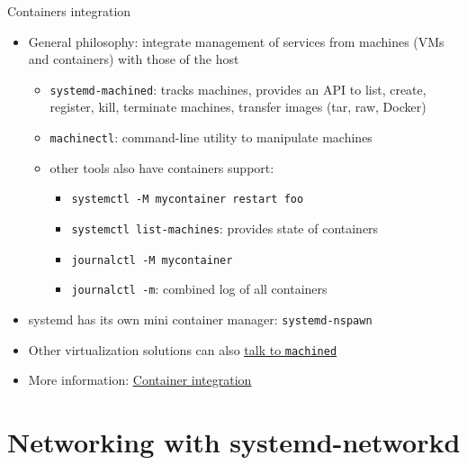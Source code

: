 \documentclass[11pt,final,usepdftitle=false]{beamer}
\begin{document}
\begin{frame}{Containers integration}
\begin{itemize}
	\item General philosophy: \alert{integrate management of services from machines (VMs and containers) with those of the host}
	\begin{itemize}
		\item \texttt{systemd-machined}: tracks machines, provides an API to list, create, register, kill, terminate machines, transfer images (tar, raw, Docker)
			\hbr
		\item \texttt{machinectl}: command-line utility to manipulate machines
			\hbr
		\item other tools also have containers support:
			\begin{itemize}
				\item \texttt{systemctl -M mycontainer restart foo}
				\item \texttt{systemctl list-machines}: provides state of containers
				\item \texttt{journalctl -M mycontainer}
				\item \texttt{journalctl -m}: combined log of all containers
			\end{itemize}
	\end{itemize}
\hbr
\item systemd has its own mini container manager: \texttt{systemd-nspawn}
\hbr
\item Other virtualization solutions can also \href{http://www.freedesktop.org/wiki/Software/systemd/machined/}{\ul{talk to \texttt{machined}}}
\hbr
\item More information: \href{http://0pointer.net/blog/systemd-for-administrators-part-xxi.html}{\ul{Container integration}}
\end{itemize}
\end{frame}

\section{Networking with systemd-networkd}
\end{document}
